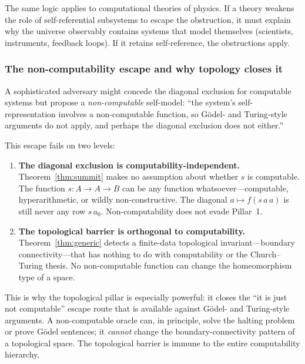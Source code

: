 \documentclass[11pt]{article}
\begin{document}
\noindent
The same logic applies to computational theories of physics.  If a
theory weakens the role of self-referential subsystems to escape the
obstruction, it must explain why the universe observably contains
systems that model themselves (scientists, instruments, feedback loops).
If it retains self-reference, the obstructions apply.

\subsubsection{The non-computability escape and why topology closes it}
\label{sec:noncomp-escape}

A sophisticated adversary might concede the diagonal exclusion for
computable systems but propose a \emph{non-computable} self-model: ``the
system's self-representation involves a non-computable function, so
G\"odel- and Turing-style arguments do not apply, and perhaps the
diagonal exclusion does not either.''

This escape fails on two levels:

\begin{enumerate}[label=(\arabic*),itemsep=0.3ex]
\item \textbf{The diagonal exclusion is computability-independent.}
  Theorem~\ref{thm:summit} makes no assumption about whether $s$ is
  computable.  The function $s : A \to A \to B$ can be any function
  whatsoever---computable, hyperarithmetic, or wildly non-constructive.
  The diagonal $a \mapsto f(s\,a\,a)$ is still never any row $s\,a_0$.
  Non-computability does not evade Pillar~1.
\item \textbf{The topological barrier is orthogonal to computability.}
  Theorem~\ref{thm:generic} detects a finite-data topological
  invariant---boundary connectivity---that has nothing to do with
  computability or the Church--Turing thesis.  No non-computable
  function can change the homeomorphism type of a space.
\end{enumerate}

\noindent
This is why the topological pillar is especially powerful: it closes
the ``it is just not computable'' escape route that is available
against G\"odel- and Turing-style arguments.  A non-computable oracle
can, in principle, solve the halting problem or prove G\"odel sentences;
it \emph{cannot} change the boundary-connectivity pattern of a
topological space.  The topological barrier is immune to the entire
computability hierarchy.
\end{document}
